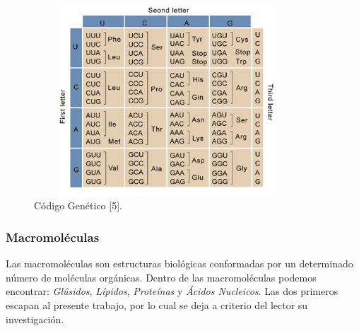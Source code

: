 \begin{enumerate}
		\begin{figure}[h]		
			\hspace*{2cm} \includegraphics[width=3.9in, height=2.8in]{image/gencode.png}
			\caption{Código Genético [5].}
			\label{codGen}			
		\end{figure}	
\end{enumerate}

\vskip 2.5cm
\subsubsection{Macromoléculas}
Las macromoléculas son estructuras biológicas conformadas por un determinado número de moléculas orgánicas. Dentro de las macromoléculas podemos encontrar: \emph{Glúsidos}, \emph{Lípidos}, \emph{Proteínas} y
\emph{Ácidos Nucleicos}. Las dos primeros escapan al presente trabajo, por lo cual se deja a criterio del lector su investigación.

